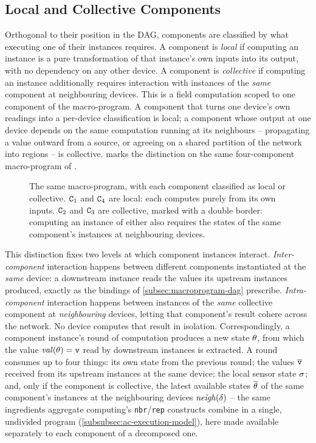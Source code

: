 \subsection{Local and Collective Components}
\label{subsec:local-collective-components}

Orthogonal to their position in the \ac{DAG},
components are classified by what executing one of their instances requires.
%
A component is \emph{local} if computing an instance is a pure transformation of that instance's own inputs into its output,
with no dependency on any other device.
%
A component is \emph{collective} if computing an instance additionally requires interaction with instances of the \emph{same} component at neighbouring devices.
This is a field computation scoped to one component of the macro-program.
%
A component that turns one device's own readings into a per-device classification is local;
a component whose output at one device depends on the same computation running at its neighbours -- propagating a value outward from a source,
or agreeing on a shared partition of the network into regions -- is collective.
%
 marks the distinction on the same four-component macro-program of .

\begin{figure}[t]
    \centering
    
    \caption[Local and collective components in the same macro-program]{The same macro-program, with each component classified as local or collective. $\mathtt{C}_1$ and $\mathtt{C}_4$ are local: each computes purely from its own inputs. $\mathtt{C}_2$ and $\mathtt{C}_3$ are collective, marked with a double border: computing an instance of either also requires the states of the same component's instances at neighbouring devices.}
    \label{fig:local-collective-components}
\end{figure}

This distinction fixes two levels at which component instances interact.
%
\emph{Inter-component} interaction happens between different components instantiated at the \emph{same} device:
a downstream instance reads the values its upstream instances produced,
exactly as the bindings of \cref{subsec:macroprogram-dag} prescribe.
%
\emph{Intra-component} interaction happens between instances of the \emph{same} collective component at \emph{neighbouring} devices,
letting that component's result cohere across the network.
No device computes that result in isolation.
%
Correspondingly, a component instance's round of computation produces a new state $\theta$,
from which the value $\mathit{val}(\theta) = \mathtt{v}$ read by downstream instances is extracted.
A round consumes up to four things:
its own state from the previous round;
the values $\overline{\mathtt{v}}$ received from its upstream instances at the same device;
the local sensor state $\sigma$;
and,
only if the component is collective,
the latest available states $\overline{\theta}$ of the same component's instances at the neighbouring devices $\mathit{neigh}(\delta)$ --
the same ingredients aggregate computing's \texttt{nbr}/\texttt{rep} constructs combine in a single, undivided program (\cref{subsubsec:ac-execution-model}),
here made available separately to each component of a decomposed one.

